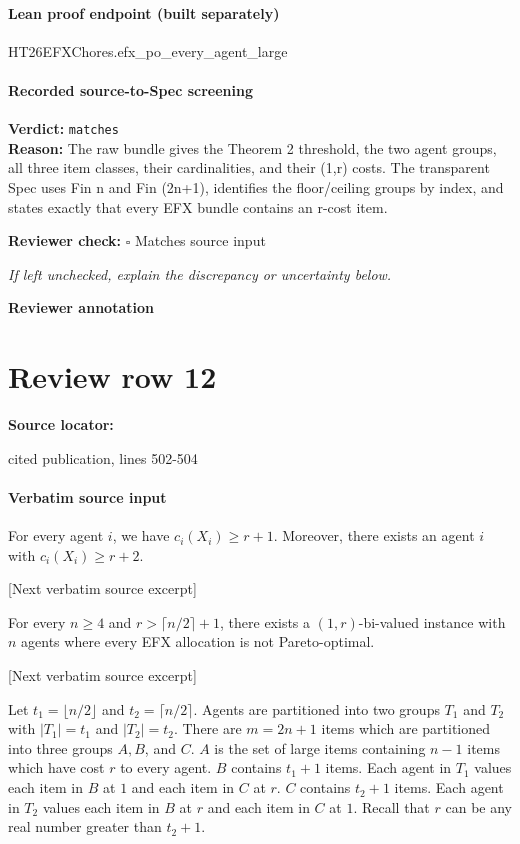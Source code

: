 \documentclass[10pt]{article}
\newcommand{\reviewerbox}{%
  \par\noindent\fbox{\parbox{0.96\linewidth}{\rule{0pt}{0.38in}}}\par
}
\newcommand{\reviewmatch}[1]{%
  \par\noindent\textbf{Reviewer check:} $\square$\; #1\par
  \noindent\emph{If left unchecked, explain the discrepancy or uncertainty below.}\par
}
\begin{document}
\paragraph{Lean proof endpoint (built separately)}\begin{ReviewVerbatim}
HT26EFXChores.efx_po_every_agent_large
\end{ReviewVerbatim}

\paragraph{Recorded source-to-Spec screening}
\textbf{Verdict:} \texttt{matches}
\\
\textbf{Reason:} The raw bundle gives the Theorem 2 threshold, the two agent groups, all three item classes, their cardinalities, and their (1,r) costs. The transparent Spec uses Fin n and Fin (2n+1), identifies the floor/ceiling groups by index, and states exactly that every EFX bundle contains an r-cost item.
\reviewmatch{Matches source input}
\noindent\textbf{Reviewer annotation}\par
\reviewerbox
\clearpage
\hypertarget{source-claim-8a3c68dd9df286a5}{}
\section*{Review row 12}
\textbf{Source locator:} {\footnotesize\raggedright cited publication, lines 502-\allowbreak{}504\par}
\paragraph{Verbatim source input}
\begin{ReviewVerbatim}
\begin{proposition}\label{prop:r+1r+2}
    For every agent $i$, we have $c_i(X_i)\geq r+1$. Moreover, there exists an agent $i$ with $c_i(X_i)\geq r+2$.
\end{proposition}

[Next verbatim source excerpt]

\begin{theorem}\label{thm:EFXPO}
    For every $n\geq 4$ and $r>\lceil n/2\rceil+1$, there exists a $(1,r)$-bi-valued instance with $n$ agents where every EFX allocation is not Pareto-optimal.
\end{theorem}

[Next verbatim source excerpt]

Let $t_1=\lfloor n/2\rfloor$ and $t_2=\lceil n/2\rceil$.
Agents are partitioned into two groups $T_1$ and $T_2$ with $|T_1|=t_1$ and $|T_2|=t_2$.
There are $m=2n+1$ items which are partitioned into three groups $A,B$, and $C$.
$A$ is the set of large items containing $n-1$ items which have cost $r$ to every agent.
$B$ contains $t_1+1$ items.
Each agent in $T_1$ values each item in $B$ at $1$ and each item in $C$ at $r$.
$C$ contains $t_2+1$ items.
Each agent in $T_2$ values each item in $B$ at $r$ and each item in $C$ at $1$.
Recall that $r$ can be any real number greater than $t_2+1$.
\end{ReviewVerbatim}
\end{document}
